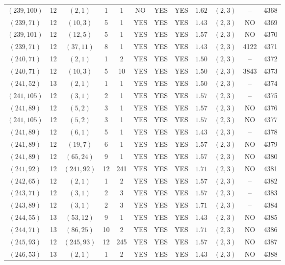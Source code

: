 \begin{longtable}{|c|c|c|c|c|c|c|c|c|c|c|c|}
$(239,100)$ & 12 & $(2,1)$ & 1 & 1 & NO & YES & YES & $1.62$ & $(2,3)$ & -- & 4368\\
$(239,71)$ & 12 & $(10,3)$ & 5 & 1 & YES & YES & YES & $1.43$ & $(2,3)$ & NO & 4369\\
$(239,101)$ & 12 & $(12,5)$ & 5 & 1 & YES & YES & YES & $1.57$ & $(2,3)$ & NO & 4370\\
$(239,71)$ & 12 & $(37,11)$ & 8 & 1 & YES & YES & YES & $1.43$ & $(2,3)$ & 4122 & 4371\\
$(240,71)$ & 12 & $(2,1)$ & 1 & 2 & YES & YES & YES & $1.50$ & $(2,3)$ & -- & 4372\\
$(240,71)$ & 12 & $(10,3)$ & 5 & 10 & YES & YES & YES & $1.50$ & $(2,3)$ & 3843 & 4373\\
$(241,52)$ & 13 & $(2,1)$ & 1 & 1 & YES & YES & YES & $1.50$ & $(2,3)$ & -- & 4374\\
$(241,105)$ & 12 & $(3,1)$ & 2 & 1 & YES & YES & YES & $1.57$ & $(2,3)$ & -- & 4375\\
$(241,89)$ & 12 & $(5,2)$ & 3 & 1 & YES & YES & YES & $1.57$ & $(2,3)$ & NO & 4376\\
$(241,105)$ & 12 & $(5,2)$ & 3 & 1 & YES & YES & YES & $1.57$ & $(2,3)$ & NO & 4377\\
$(241,89)$ & 12 & $(6,1)$ & 5 & 1 & YES & YES & YES & $1.43$ & $(2,3)$ & -- & 4378\\
$(241,89)$ & 12 & $(19,7)$ & 6 & 1 & YES & YES & YES & $1.57$ & $(2,3)$ & NO & 4379\\
$(241,89)$ & 12 & $(65,24)$ & 9 & 1 & YES & YES & YES & $1.57$ & $(2,3)$ & NO & 4380\\
$(241,92)$ & 12 & $(241,92)$ & 12 & 241 & YES & YES & YES & $1.71$ & $(2,3)$ & NO & 4381\\
$(242,65)$ & 12 & $(2,1)$ & 1 & 2 & YES & YES & YES & $1.57$ & $(2,3)$ & -- & 4382\\
$(243,71)$ & 12 & $(3,1)$ & 2 & 3 & YES & YES & YES & $1.57$ & $(2,3)$ & -- & 4383\\
$(243,89)$ & 12 & $(3,1)$ & 2 & 3 & YES & YES & YES & $1.71$ & $(2,3)$ & -- & 4384\\
$(244,55)$ & 13 & $(53,12)$ & 9 & 1 & YES & YES & YES & $1.43$ & $(2,3)$ & NO & 4385\\
$(244,71)$ & 13 & $(86,25)$ & 10 & 2 & YES & YES & YES & $1.71$ & $(2,3)$ & NO & 4386\\
$(245,93)$ & 12 & $(245,93)$ & 12 & 245 & YES & YES & YES & $1.57$ & $(2,3)$ & NO & 4387\\
$(246,53)$ & 13 & $(2,1)$ & 1 & 2 & YES & YES & YES & $1.43$ & $(2,3)$ & NO & 4388\\

\end{longtable}
